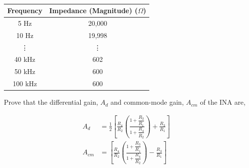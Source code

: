 	\begin{table}[H]
		\centering
		\caption{\jadual}	%
		\begin{tabular}{cc}
			\toprule
			\multicolumn{1}{l}{\textbf{Frequency}} & \multicolumn{1}{l}{\textbf{Impedance (Magnitude) ($\Omega$)}} \\
			\midrule
			5 Hz  & 20,000 \\
			10 Hz & 19,998 \\
			\vdots     & \vdots \\
			40 kHz & 602 \\
			50 kHz & 600 \\
			100 kHz & 600 \\
			\bottomrule
		\end{tabular}
		\label{table:freqmag}%
	\end{table}%
	
	\listbeginx
	\item Prove that the differential gain, $A_d$ and common-mode gain, $A_{cm}$ of the INA are, 
	
	
	\begin{align*} 
		A_d &= \frac{1}{2}
		\left[
			\frac{R_4}{R_2}
				\left(\frac
					{1+\dfrac{R_3}{R_1}}
					{1+\dfrac{R_4}{R_2}}
				\right)
			+\frac{R_3}{R_1}
		\right] \\
		A_{cm} &= 
		\left[
			\frac{R_4}{R_2}
				\left(\frac
					{1+\dfrac{R_3}{R_1}}
					{1+\dfrac{R_4}{R_2}}
				\right)
			-\frac{R_3}{R_1}
		\right] 
	\end{align*}

	
